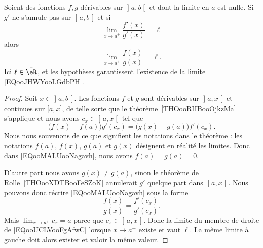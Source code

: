 \begin{proposition}     \label{PROPooBZHTooHmyGsy}
	Soient des fonctions \( f,g\) dérivables sur \( \mathopen] a , b \mathclose[\) et dont la limite en \( a\) est nulle. Si \( g'\) ne s'annule pas sur \( \mathopen] a , b \mathclose[\) et si
	\begin{equation}
		\lim_{x\to a^+} \frac{ f'(x) }{ g'(x) }=\ell
	\end{equation}
	alors
	\begin{equation}        \label{EQooJHWYooLGdbPH}
		\lim_{x\to a^+} \frac{ f(x) }{ g(x) }=\ell.
	\end{equation}
	Ici \( \ell\in \bar \eR\), et les hypothèses garantissent l'existence de la limite \eqref{EQooJHWYooLGdbPH}.
\end{proposition}

\begin{proof}
	Soit \( x\in\mathopen] a , b \mathclose[\). Les fonctions \( f\) et \( g\) sont dérivables sur \( \mathopen] a , x \mathclose[\) et continues sur \( \mathopen[ a , x \mathclose]\), de telle sorte que le théorème~\ref{THOooRIIBooOjkzMa} s'applique et nous avons \( c_x\in \mathopen] a , x \mathclose[\) tel que
		\begin{equation}        \label{EQooMALUooNagavh}
			\big( f(x)-f(a) \big)g'(c_x)=\big( g(x)-g(a) \big)f'(c_x).
		\end{equation}
		Nous nous souvenons de ce que signifient les notations dans le théorème : les notations \( f(a)\), \( f(x)\), \( g(a)\) et \( g(x)\) désignent en réalité les limites. Donc dans \eqref{EQooMALUooNagavh}, nous avons \( f(a)=g(a)=0\).

		D'autre part nous avons \( g(x)\neq g(a)\), sinon le théorème de Rolle~\ref{THOooXDTBooFeSZoK} annulerait \( g'\) quelque part dans \( \mathopen] a , x \mathclose[\). Nous pouvons donc récrire \eqref{EQooMALUooNagavh} sous la forme
		\begin{equation}        \label{EQooUCLVooFgAfwC}
			\frac{ f(x) }{ g(x) }=\frac{ f'(c_x) }{ g'(c_x) }.
		\end{equation}
		Mais \( \lim_{x\to a^+} c_x=a\) parce que \( c_x\in\mathopen] a , x \mathclose[\). Donc la limite du membre de droite de \eqref{EQooUCLVooFgAfwC} lorsque \( x\to a^+\) existe et vaut \( \ell\). La même limite à gauche doit alors exister et valoir la même valeur.
\end{proof}

